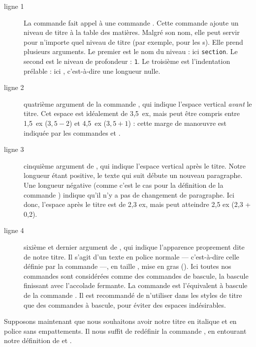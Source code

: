 \begin{description}
\item[ligne 1]La commande  fait appel à une commande . Cette commande ajoute  un niveau de titre à la table des matières. Malgré son nom, elle peut servir pour n'importe quel niveau de titre (par exemple, pour les s). Elle prend plusieurs arguments. Le premier est le nom du niveau : ici \verb|section|. Le second est le niveau de profondeur : \verb|1|. Le troisième est l'indentation prélable : ici , c'est-à-dire une longueur nulle.

\item[ligne 2] quatrième argument de la commande , qui indique l'espace vertical \emph{avant} le titre. Cet espace est idéalement de 3,5~ex, mais peut être compris entre 1,5~ex ($3,5 - 2$) et 4,5~ex ($3,5 + 1$) :  cette marge de manœuvre est indiquée par les commandes   et .
\item[ligne 3] cinquième argument de , qui indique l'espace vertical après le titre. Notre longueur étant positive, le texte qui suit débute un nouveau paragraphe. Une longueur négative (comme c'est le cas pour la définition de la commande ) indique qu'il n'y a pas de changement de paragraphe. Ici donc, l'espace après le titre est de 2,3 ex, mais peut atteindre 2,5 ex (2,3 + 0,2).
\item[ligne 4] sixième et dernier argument de , qui indique l'apparence proprement dite de notre titre. Il s'agit d'un texte en police normale --- c'est-à-dire celle définie par la commande  ---, en taille , mise en gras (). Ici toutes nos commandes sont considérées comme des commandes de bascule, la bascule finissant avec l'accolade fermante. La commande  est l'équivalent à bascule de la commande . Il est recommandé de n'utiliser dans les styles de titre que des commandes à bascule, pour éviter des espaces indésirables.\label{bfseries}
\end{description}

Supposons maintenant que nous souhaitons avoir notre titre en italique et en police sans empattements. Il nous suffit de redéfinir la commande , en entourant notre définition de  et .

\begin{latexcode}
\makeatletter
\renewcommand\section{\@startsection {section}{1}{\z@}%
                             {-3.5ex \@plus -1ex \@minus -.2ex}%
                             {2.3ex \@plus.2ex}%
                             {\sffamily\Large\itshape}}
\makeatother
\end{latexcode}

